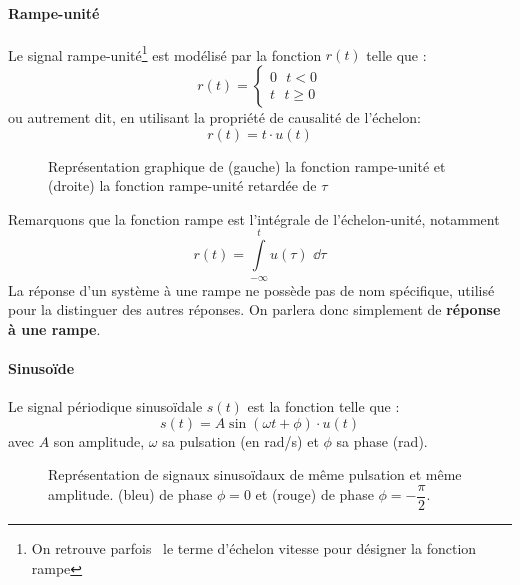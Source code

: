 \paragraph{Rampe-unité}

Le signal rampe-unité\footnote{On retrouve parfois~\cite{sueurautomatique} le terme 
d'échelon vitesse pour désigner la fonction rampe} est modélisé par la fonction $r(t)$ telle que :
$$
r(t)=
\begin{cases}
	0\,\,\,\,t<0 \\
	t\,\,\,\,t\geq0 
\end{cases}
$$
ou autrement dit, en utilisant la propriété de causalité de l'échelon:
$$
r(t)=t\cdot u(t)
$$

\begin{figure}[!h]
\begin{center}

\end{center}
    \caption{Représentation graphique de (gauche) la fonction rampe-unité et (droite) la fonction
        rampe-unité retardée de $\tau$\label{fig-rampe}}
\end{figure}
Remarquons que la fonction rampe est l'intégrale de l'échelon-unité, notamment 
$$
r(t)=\int\limits_{-\infty}^{t} u(\tau)\,\,\dd{\tau}
$$
La réponse d'un système à une rampe ne possède pas de nom spécifique, 
utilisé pour la distinguer des autres réponses. On parlera donc simplement 
de \textbf{réponse à une rampe}. 
\paragraph{Sinuso\"ide}
Le signal périodique sinuso\"idale $s(t)$ est la fonction telle que :
$$
s(t)=A\sin{(\omega t +\phi)}\cdot u(t)
$$
avec $A$ son amplitude, $\omega$ sa pulsation (en rad/s) et $\phi$ sa phase (rad).
\begin{figure}[!h]
\begin{center}

\end{center}
    \caption{Représentation de signaux sinuso\"idaux de même pulsation et même amplitude. 
    (bleu) de phase $\phi=0$ et (rouge) de phase $\phi=-\dfrac{\pi}{2}$.\label{fig-sin}}
\end{figure}


